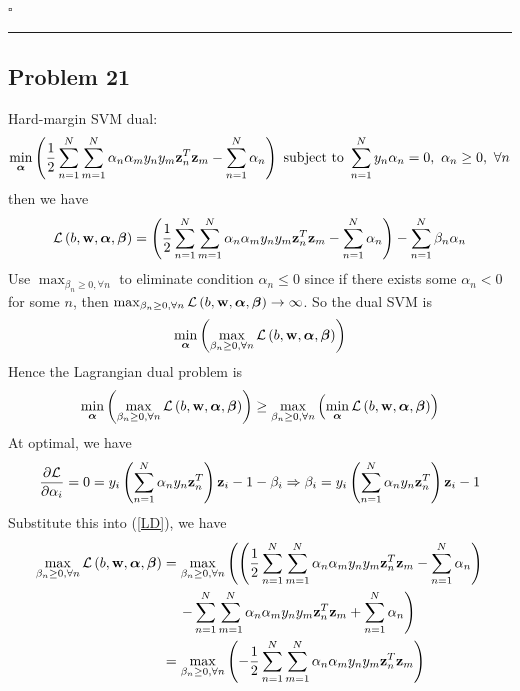 \documentclass[12pt]{article}
\newcommand*{\QEDB}{\hfill\ensuremath{\square}}
\newcommand{\ParTh}[1]{\left(#1\right)}
\newcommand{\BF}[1]{{\bf#1}}
\newcommand{\horrule}[1]{\rule{\linewidth}{#1}}
\begin{document}
\QEDB

\horrule{0.5pt}

\subsection*{Problem 21}

Hard-margin SVM dual:
\begin{align}
\min_{\bm{\alpha}}\ParTh{\dfrac{1}{2}\sum_{n=1}^{N}\sum_{m=1}^{N}\alpha_n\alpha_my_ny_m\BF{z}^T_n\BF{z}_m-\sum_{n=1}^{N}\alpha_n}\text{ subject to }\sum_{n=1}^{N}y_n\alpha_n=0,~\alpha_n\geq0,~\forall n
\end{align}
then we have
\begin{align}
\mathcal{L}\ParTh{b,\BF{w},\bm{\alpha},\bm{\beta}}=\ParTh{\dfrac{1}{2}\sum_{n=1}^{N}\sum_{m=1}^{N}\alpha_n\alpha_my_ny_m\BF{z}^T_n\BF{z}_m-\sum_{n=1}^{N}\alpha_n}-\sum_{n=1}^{N}\beta_n\alpha_n
\end{align}
Use $\max_{\beta_n\geq0,\forall n}$ to eliminate condition $\alpha_n\leq0$ since if there exists some $\alpha_n<0$ for some $n$, then $\max_{\beta_n\geq0,\forall n}\mathcal{L}\ParTh{b,\BF{w},\bm{\alpha},\bm{\beta}}\rightarrow\infty$. So the dual SVM is
\begin{align}
\min_{\bm{\alpha}}\ParTh{\max_{\beta_n\geq0,\forall n}\mathcal{L}\ParTh{b,\BF{w},\bm{\alpha},\bm{\beta}}}
\end{align}
Hence the Lagrangian dual problem is
\begin{align}
\min_{\bm{\alpha}}\ParTh{\max_{\beta_n\geq0,\forall n}\mathcal{L}\ParTh{b,\BF{w},\bm{\alpha},\bm{\beta}}}\geq\max_{\beta_n\geq0,\forall n}\ParTh{\min_{\bm{\alpha}}\mathcal{L}\ParTh{b,\BF{w},\bm{\alpha},\bm{\beta}}}
\label{LD}
\end{align}
At optimal, we have
\begin{align}
\dfrac{\partial\mathcal{L}}{\partial\alpha_i}=0=y_i\ParTh{\sum_{n=1}^{N}\alpha_ny_n\BF{z}^T_n}\BF{z}_i-1-\beta_i\Rightarrow\beta_i=y_i\ParTh{\sum_{n=1}^{N}\alpha_ny_n\BF{z}^T_n}\BF{z}_i-1
\end{align}
Substitute this into (\ref{LD}), we have
\begin{align}
\nonumber
\max_{\beta_n\geq0,\forall n}\mathcal{L}\ParTh{b,\BF{w},\bm{\alpha},\bm{\beta}}&=\max_{\beta_n\geq0,\forall n}\left(\ParTh{\dfrac{1}{2}\sum_{n=1}^{N}\sum_{m=1}^{N}\alpha_n\alpha_my_ny_m\BF{z}^T_n\BF{z}_m-\sum_{n=1}^{N}\alpha_n}\right.\\
&\hspace{4mm}\left.-\sum_{n=1}^{N}\sum_{m=1}^{N}\alpha_n\alpha_my_ny_m\BF{z}^T_n\BF{z}_m+\sum_{n=1}^{N}\alpha_n\right)\\
&=\max_{\beta_n\geq0,\forall n}\ParTh{-\dfrac{1}{2}\sum_{n=1}^{N}\sum_{m=1}^{N}\alpha_n\alpha_my_ny_m\BF{z}^T_n\BF{z}_m}
\end{align}
\end{document}
